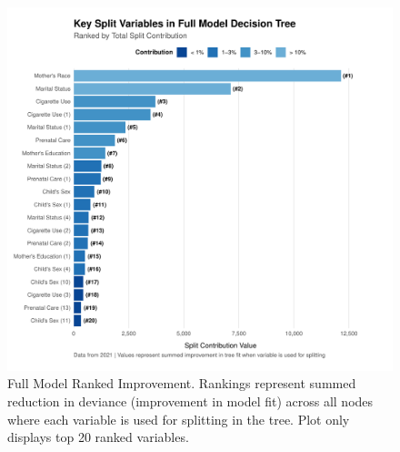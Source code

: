 
\begin{figure}
    \centering
    \includegraphics[width=1\linewidth]{chapters/chapter3/figures/improvement/tree_split_contribution_top20_Full Model.pdf}
    \caption{Full Model Ranked Improvement. Rankings represent summed reduction in deviance (improvement in model fit) across all nodes where each variable is used for splitting in the tree. Plot only displays top 20 ranked variables.}
    \label{fig:full-model-ranked-imp}
\end{figure}

